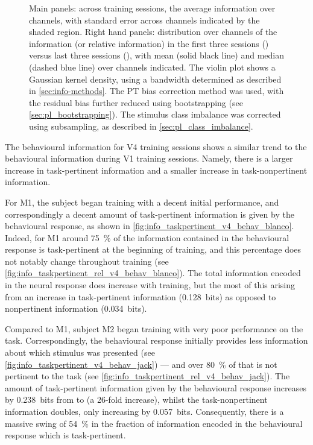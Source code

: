 \begin{figure}[htbp]
{Main panels: across training sessions, the average information over channels, with standard error across channels indicated by the shaded region.
Right hand panels: distribution over channels of the information (or relative information) in the first three sessions () versus last three sessions (), with mean (solid black line) and median (dashed blue line) over channels indicated.
The violin plot shows a Gaussian kernel density, using a bandwidth determined as described in \autoref{sec:info-methods}.
The \ac{PT} bias correction method was used, with the residual bias further reduced using bootstrapping (see \autoref{sec:pl_bootstrapping}).
The stimulus class imbalance was corrected using subsampling, as described in \autoref{sec:pl_class_imbalance}.
    \label{fig:info_taskpertinent_v4_ch}
}
\end{figure}


The behavioural information for \ac{V4} training sessions shows a similar trend to the behavioural information during \ac{V1} training sessions.
Namely, there is a larger increase in task-pertinent information and a smaller increase in task-nonpertinent information.

For \ac{M1}, the subject began training with a decent initial performance, and correspondingly a decent amount of task-pertinent information is given by the behavioural response, as shown in \autoref{fig:info_taskpertinent_v4_behav_blanco}.
Indeed, for \ac{M1} around \SI{75}{\percent} of the information contained in the behavioural response is task-pertinent at the beginning of training, and this percentage does not notably change throughout training (see \autoref{fig:info_taskpertinent_rel_v4_behav_blanco}).
The total information encoded in the neural response does increase with training, but the most of this arising from an increase in task-pertinent information (\SI{+0.128}{bits}) as opposed to nonpertinent information (\SI{+0.034}{bits}).

Compared to \ac{M1}, subject \ac{M2} began training with very poor performance on the task.
Correspondingly, the behavioural response initially provides less information about which stimulus was presented (see \autoref{fig:info_taskpertinent_v4_behav_jack}) --- and over \SI{80}{\percent} of that is not pertinent to the task (see \autoref{fig:info_taskpertinent_rel_v4_behav_jack}).
The amount of task-pertinent information given by the behavioural response increases by \SI{0.238}{bits} from  to  (a 26-fold increase), whilst the task-nonpertinent information doubles, only increasing by \SI{0.057}{bits}.
Consequently, there is a massive swing of \SI{+54}{\percent} in the fraction of information encoded in the behavioural response which is task-pertinent.


